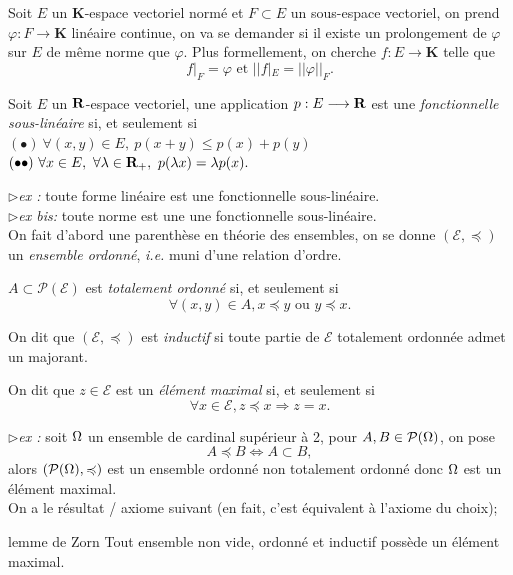 \documentclass[a4paper,11pt, twoside]{article}
\begin{document}
\newpage


Soit $E$ un $\mathbf K$-espace vectoriel normé et $F\subset E$ un sous-espace vectoriel, on prend $\varphi:F\longrightarrow \mathbf K$ linéaire continue, on va se demander si il existe un prolongement de $\varphi$ sur $E$ de même norme que $\varphi$. Plus formellement, on cherche $f:E\longrightarrow \mathbf K$ telle que 
$$f\big|_F=\varphi\text{ et }||f|_E=||\varphi||_F.$$


\begin{Def}
  Soit $E$ un $\mathbf R$-espace vectoriel, une application $p:E\longrightarrow\mathbf R$ est une \emph{fonctionnelle sous-linéaire} si, et seulement si\\
  $(\bullet)\ \forall (x,y)\in E,\ p(x+y)\leqslant p(x)+p(y)$\\
  $(\bullet\bullet)\ \forall x\in E,\ \forall \lambda\in \mathbf R_+,\ p(\lambda x)=\lambda p(x).$
\end{Def}


$\triangleright$\emph{ex :} toute forme linéaire est une fonctionnelle sous-linéaire.\\

$\triangleright$\emph{ex bis:} toute norme est une une fonctionnelle sous-linéaire.\\


On fait d'abord une parenthèse en théorie des ensembles, on se donne $(\mathcal E,\preccurlyeq)$ un \emph{ensemble ordonné}, \emph{i.e.} muni d'une relation d'ordre.

$A\subset \mathcal P(\mathcal E)$ est \emph{totalement ordonné} si, et seulement si 
$$\forall (x,y)\in A, x\preccurlyeq y\text{ ou }y\preccurlyeq x.$$

On dit que $(\mathcal E,\preccurlyeq)$ est \emph{inductif} si toute partie de $\mathcal E$ totalement ordonnée admet un majorant.

On dit que $z\in \mathcal E$ est un \emph{élément maximal} si, et seulement si 
$$\forall x\in \mathcal E, z\preccurlyeq x\Rightarrow z=x.$$


$\triangleright$\emph{ex :} soit $\Omega$ un ensemble de cardinal supérieur à 2, pour $A,B\in\mathcal P(\Omega)$, on pose
$$A\preccurlyeq B\Leftrightarrow A\subset B,$$
alors $(\mathcal P(\Omega),\preccurlyeq)$ est un ensemble ordonné non totalement ordonné donc $\Omega$ est un élément maximal.\\[1em]

On a le résultat / axiome suivant (en fait, c'est équivalent à l'axiome du choix);


\begin{thC}{lemme de Zorn}
  Tout ensemble non vide, ordonné et inductif possède un élément maximal.
\end{thC}
\end{document}
